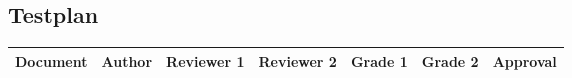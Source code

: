 \begin{landscape}
	\section*{Testplan}
	\begin{longtable}[htbp]{ l l l l l l l }
		\textbf{Document} & \textbf{Author} & \textbf{Reviewer 1} & \textbf{Reviewer 2} & \textbf{Grade 1} & \textbf{Grade 2} & \textbf{Approval}\\ \hline
	\end{longtable}
\end{landscape}
